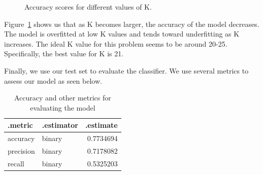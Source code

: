 \documentclass[
  letterpaper,
  DIV=11,
  numbers=noendperiod]{scrartcl}
\begin{document}
\begin{figure}


\caption{\label{fig-acc-k}Accuracy scores for different values of K.}

\end{figure}%

Figure~\ref{fig-acc-k} shows us that as K becomes larger, the accuracy
of the model decreases. The model is overfitted at low K values and
tends toward underfitting as K increases. The ideal K value for this
problem seems to be around 20-25. Specifically, the best value for K is
21.

Finally, we use our test set to evaluate the classifier. We use several
metrics to assess our model as seen below.

\begin{longtable}[]{@{}llr@{}}

\caption{\label{tbl-test-acc}Accuracy and other metrics for evaluating
the model}

\tabularnewline

\toprule\noalign{}
.metric & .estimator & .estimate \\
\midrule\noalign{}
\endhead
\bottomrule\noalign{}
\endlastfoot
accuracy & binary & 0.7734694 \\
precision & binary & 0.7178082 \\
recall & binary & 0.5325203 \\

\end{longtable}
\end{document}
